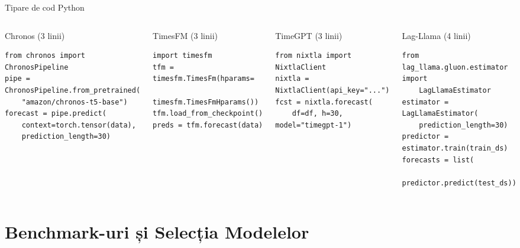 \documentclass[9pt, aspectratio=169, t]{beamer}
\begin{document}
\begin{frame}[fragile]{Tipare de cod Python}
    \begin{cminipage}{0.95\textwidth}
    \vspace{-3mm}
    {\scriptsize
    \begin{columns}[T]
        \begin{block}{Chronos (3 linii)}
            \begin{verbatim}
from chronos import ChronosPipeline
pipe = ChronosPipeline.from_pretrained(
    "amazon/chronos-t5-base")
forecast = pipe.predict(
    context=torch.tensor(data),
    prediction_length=30)
            \end{verbatim}
        \end{block}
        \vspace{-3mm}
        \begin{block}{TimesFM (3 linii)}
            \begin{verbatim}
import timesfm
tfm = timesfm.TimesFm(hparams=
    timesfm.TimesFmHparams())
tfm.load_from_checkpoint()
preds = tfm.forecast(data)
            \end{verbatim}
        \end{block}

        \begin{block}{TimeGPT (3 linii)}
            \begin{verbatim}
from nixtla import NixtlaClient
nixtla = NixtlaClient(api_key="...")
fcst = nixtla.forecast(
    df=df, h=30, model="timegpt-1")
            \end{verbatim}
        \end{block}
        \vspace{-3mm}
        \begin{block}{Lag-Llama (4 linii)}
            \begin{verbatim}
from lag_llama.gluon.estimator import
    LagLlamaEstimator
estimator = LagLlamaEstimator(
    prediction_length=30)
predictor = estimator.train(train_ds)
forecasts = list(
    predictor.predict(test_ds))
            \end{verbatim}
        \end{block}
    \end{columns}
    }
    \end{cminipage}
\end{frame}

\section{Benchmark-uri și Selecția Modelelor}
\end{document}
